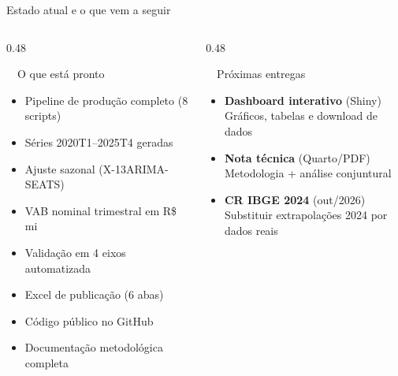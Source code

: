 \documentclass[aspectratio=169, 11pt]{beamer}
\begin{document}
\begin{frame}{Estado atual e o que vem a seguir}

  \begin{columns}[T]
    \begin{column}{0.48\textwidth}
      \begin{exampleblock}{\faCheckCircle\ \ O que está pronto}
        \begin{itemize}
          \item[\color{seplangreen}\faCheck] Pipeline de produção completo (8 scripts)
          \item[\color{seplangreen}\faCheck] Séries 2020T1--2025T4 geradas
          \item[\color{seplangreen}\faCheck] Ajuste sazonal (X-13ARIMA-SEATS)
          \item[\color{seplangreen}\faCheck] VAB nominal trimestral em R\$ mi
          \item[\color{seplangreen}\faCheck] Validação em 4 eixos automatizada
          \item[\color{seplangreen}\faCheck] Excel de publicação (6 abas)
          \item[\color{seplangreen}\faCheck] Código público no GitHub
          \item[\color{seplangreen}\faCheck] Documentação metodológica completa
        \end{itemize}
      \end{exampleblock}
    \end{column}

    \begin{column}{0.48\textwidth}
      \begin{alertblock}{\faTools\ \ Próximas entregas}
        \begin{itemize}
          \item[\color{seplanred}\faClock] \textbf{Dashboard interativo} (Shiny)\\
                {\small Gráficos, tabelas e download de dados}

          \vspace{0.1cm}
          \item[\color{seplanred}\faClock] \textbf{Nota técnica} (Quarto/PDF)\\
                {\small Metodologia + análise conjuntural}

          \vspace{0.1cm}
          \item[\color{seplangold}\faClock] \textbf{CR IBGE 2024} (out/2026)\\
                {\small Substituir extrapolações 2024 por dados reais}


\end{itemize}
\end{alertblock}
\end{column}
\end{columns}
\end{frame}
\end{document}

